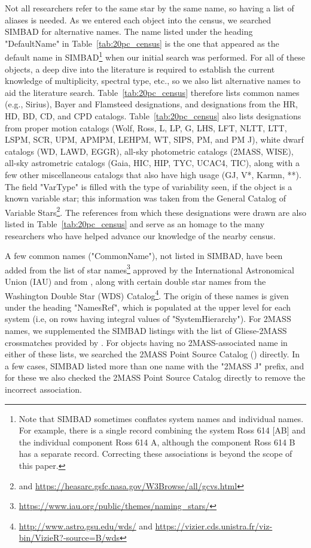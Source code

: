 \documentclass[twocolumn,tighten,twocolappendix]{aastex631}
\begin{document}
Not all researchers refer to the same star by the same name, so having a list of aliases is needed. As we entered each object into the census, we searched SIMBAD for alternative names. The name listed under the heading "DefaultName" in Table~\ref{tab:20pc_census} is the one that appeared as the default name in SIMBAD\footnote{Note that SIMBAD sometimes conflates system names and individual names. For example, there is a single record combining the system Ross 614 [AB] and the individual component Ross 614 A, although the component Ross 614 B has a separate record. Correcting these associations is beyond the scope of this paper.} when our initial search was performed.  For all of these objects, a deep dive into the literature is required to establish the current knowledge of multiplicity, spectral type, etc., so we also list alternative names to aid the literature search. Table~\ref{tab:20pc_census} therefore lists common names (e.g., Sirius), Bayer and Flamsteed designations, and designations from the HR, HD, BD, CD, and CPD catalogs. Table~\ref{tab:20pc_census} also lists designations from proper motion catalogs (Wolf, Ross, L, LP, G, LHS, LFT, NLTT, LTT, LSPM, SCR, UPM, APMPM, LEHPM, WT, SIPS, PM, and PM J), white dwarf catalogs (WD, LAWD, EGGR), all-sky photometric catalogs (2MASS, WISE), all-sky astrometric catalogs (Gaia, HIC, HIP, TYC, UCAC4, TIC), along with a few other miscellaneous catalogs that also have high usage (GJ, V*, Karmn, **). The field "VarType" is filled with the type of variability seen, if the object is a known variable star; this information was taken from the General Catalog of Variable Stars\footnote{\cite{samus2017} and \url{https://heasarc.gsfc.nasa.gov/W3Browse/all/gcvs.html}}. The references from which these designations were drawn are also listed in Table~\ref{tab:20pc_census} and serve as an homage to the many researchers who have helped advance our knowledge of the nearby census. 

A few common names ("CommonName"), not listed in SIMBAD, have been added from the list of star names\footnote{\url {https://www.iau.org/public/themes/naming\_stars/}} approved by the International Astronomical Union (IAU) and from \cite{allen1899}, along with certain double star names from the Washington Double Star (WDS) Catalog\footnote{\url {http://www.astro.gsu.edu/wds/} and \url{https://vizier.cds.unistra.fr/viz-bin/VizieR?-source=B/wds}}. The origin of these names is given under the heading "NamesRef", which is populated at the upper level for each system (i.e, on rows having integral values of "SystemHierarchy"). For 2MASS names, we supplemented the SIMBAD listings with the list of Gliese-2MASS crossmatches provided by \cite{stauffer2010}. For objects having no 2MASS-associated name in either of these lists, we searched the 2MASS Point Source Catalog (\citealt{cutri2003}) directly. In a few cases, SIMBAD listed more than one name with the "2MASS J" prefix, and for these we also checked the 2MASS Point Source Catalog directly to remove the incorrect association.
\end{document}
